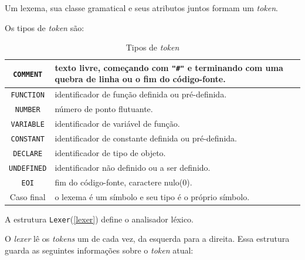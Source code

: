 Um lexema, sua classe gramatical e seus atributos juntos formam um \textit{token}.

Os tipos de \textit{token} são:

\begin{table}[ht]
\caption{Tipos de \textit{token}}
\label{tokentypes}
\begin{centering}
\begin{tabularx}{\textwidth}{||c|X||}
\hline \texttt{COMMENT} & texto livre, começando com \texttt{"\#"} e
terminando com uma quebra de linha ou o fim do código-fonte.\\ 
\hline \texttt{FUNCTION} & identificador de função definida ou pré-definida.\\
\hline \texttt{NUMBER} & número de ponto flutuante.\\
\hline \texttt{VARIABLE} & identificador de variável de função.\\
\hline \texttt{CONSTANT} &identificador de constante definida ou pré-definida.\\
\hline \texttt{DECLARE} & identificador de tipo de objeto.\\
\hline \texttt{UNDEFINED} & identificador não definido ou a ser definido.\\
\hline \texttt{EOI} & fim do código-fonte, caractere nulo(0).\\
\hline Caso final & o lexema é um símbolo e seu tipo é o próprio símbolo.\\
\hline
\end{tabularx}
\end{centering}
\end{table}

A estrutura \texttt{Lexer}(\ref{lexer}) define o analisador léxico.
\lstset{language=c++}

O \textit{lexer} lê os \textit{tokens} um de cada vez, da esquerda para a direita.
Essa estrutura guarda as seguintes informações sobre o \textit{token} atual:


